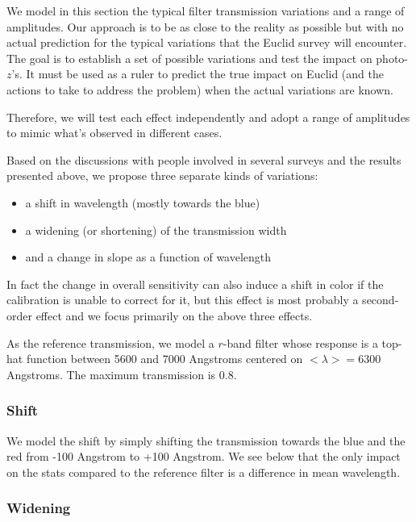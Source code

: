\documentclass{article}
\providecommand{\tightlist}{%
      \setlength{\itemsep}{0pt}\setlength{\parskip}{0pt}}
\begin{document}
We model in this section the typical filter transmission variations and
a range of amplitudes. Our approach is to be as close to the reality as
possible but with no actual prediction for the typical variations that
the Euclid survey will encounter. The goal is to establish a set of
possible variations and test the impact on photo-\(z\)'s. It must be
used as a ruler to predict the true impact on Euclid (and the actions to
take to address the problem) when the actual variations are known.

Therefore, we will test each effect independently and adopt a range of
amplitudes to mimic what's observed in different cases.

Based on the discussions with people involved in several surveys and the
results presented above, we propose three separate kinds of variations:

\begin{itemize}
\tightlist
\item
  a shift in wavelength (mostly towards the blue)
\item
  a widening (or shortening) of the transmission width
\item
  and a change in slope as a function of wavelength
\end{itemize}

In fact the change in overall sensitivity can also induce a shift in
color if the calibration is unable to correct for it, but this effect is
most probably a second-order effect and we focus primarily on the above
three effects.

As the reference transmission, we model a \(r\)-band filter whose
response is a top-hat function between 5600 and 7000 Angstroms centered
on \(<\lambda>=6300\) Angstroms. The maximum transmission is 0.8.

\hypertarget{shift}{%
\subsubsection{Shift}\label{shift}}

We model the shift by simply shifting the transmission towards the blue
and the red from -100 Angstrom to +100 Angstrom. We see below that the
only impact on the stats compared to the reference filter is a
difference in mean wavelength.

\hypertarget{widening}{%
\subsubsection{Widening}\label{widening}}
\end{document}
